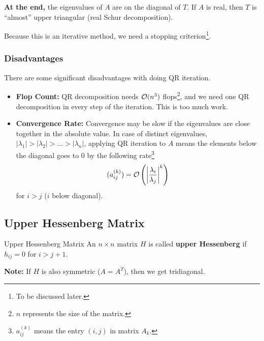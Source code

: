 \documentclass[letterpaper]{article}
\newcommand{\0}{\mathbf{0}}
\begin{document}
\bigskip 

\textbf{At the end,} the eigenvalues of $A$ are on the diagonal of $T$. If $A$ is real, then $T$ is ``almost'' upper triangular (real Schur decomposition). 

\bigskip 

Because this is an iterative method, we need a stopping criterion\footnote{To be discussed later.}.

\subsubsection{Disadvantages}
There are some significant disadvantages with doing QR iteration. 
\begin{itemize}
    \item \textbf{Flop Count:} QR decomposition needs $\mathcal{O}(n^3)$ flops\footnote{$n$ represents the size of the matrix.}, and we need one QR decomposition in every step of the iteration. This is too much work. 
    \item \textbf{Convergence Rate:} Convergence may be slow if the eigenvalues are close together in the absolute value. In case of distinct eigenvalues, $|\lambda_1| > |\lambda_2| > \hdots > |\lambda_n|$, applying QR iteration to $A$ means the elements below the diagonal goes to 0 by the following rate\footnote{$a_{ij}^{(k)}$ means the entry $(i, j)$ in matrix $A_k$.}
    \[(a_{ij}^{(k)}) = \mathcal{O}\left(\left|\frac{\lambda_i}{\lambda_j}\right|^k\right)\] for $i > j$ ($i$ below diagonal). 
\end{itemize}

\subsection{Upper Hessenberg Matrix}
\begin{definition}{Upper Hessenberg Matrix}
    An $n \times n$ matrix $H$ is called \textbf{upper Hessenberg} if $h_{ij} = 0$ for $i > j + 1$. 
\end{definition}
\textbf{Note:} If $H$ is also symmetric ($A = A^T$), then we get tridiagonal.

\end{document}
